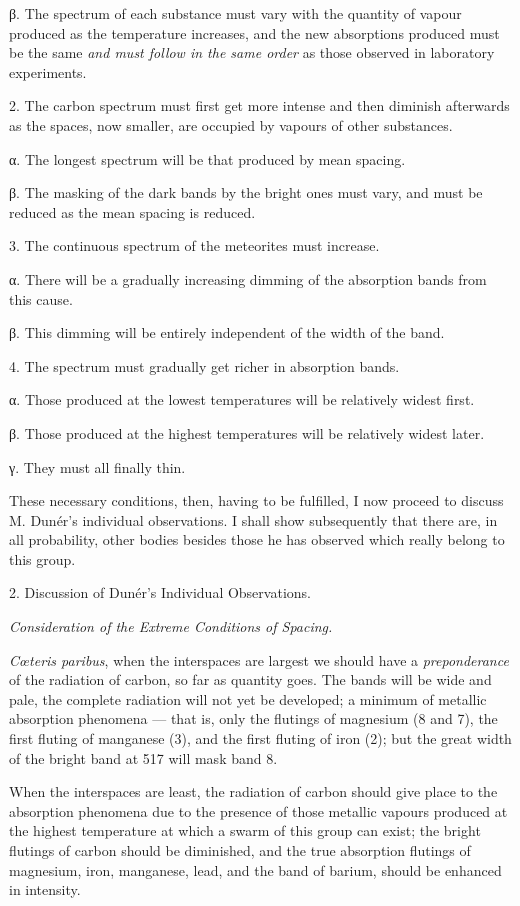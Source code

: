 \documentclass[a4paper, 12pt, oneside, polutonikogreek, english]{article}
\begin{document}
β. The spectrum of each substance must vary with the quantity of vapour produced as the temperature increases, and the new absorptions produced must be the same \emph{and must follow in the same order} as those observed in laboratory experiments.

2. The carbon spectrum must first get more intense and then diminish afterwards as the spaces, now smaller, are occupied by vapours of other substances.

α. The longest spectrum will be that produced by mean spacing.

β. The masking of the dark bands by the bright ones must vary, and must be reduced as the mean spacing is reduced.

3. The continuous spectrum of the meteorites must increase.

α. There will be a gradually increasing dimming of the absorption bands from this cause.

β. This dimming will be entirely independent of the width of the band.

4. The spectrum must gradually get richer in absorption bands.

α. Those produced at the lowest temperatures will be relatively widest first.

β. Those produced at the highest temperatures will be relatively widest later.

γ. They must all finally thin.

These necessary conditions, then, having to be fulfilled, I now proceed to discuss M. Dunér's individual observations. I shall show subsequently that there are, in all probability, other bodies besides those he has observed which really belong to this group.

2. Discussion of Dunér's Individual Observations.

\emph{Consideration of the Extreme Conditions of Spacing.}

\emph{Cœteris paribus}, when the interspaces are largest we should have a \emph{preponderance} of the radiation of carbon, so far as quantity goes. The bands will be wide and pale, the complete radiation will not yet be developed; a minimum of metallic absorption phenomena --- that is, only the flutings of magnesium (8 and 7), the first fluting of manganese (3), and the first fluting of iron (2); but the great width of the bright band at 517 will mask band 8.

When the interspaces are least, the radiation of carbon should give place to the absorption phenomena due to the presence of those metallic vapours produced at the highest temperature at which a swarm of this group can exist; the bright flutings of carbon should be diminished, and the true absorption flutings of magnesium, iron, manganese, lead, and the band of barium, should be enhanced in intensity.
\end{document}
